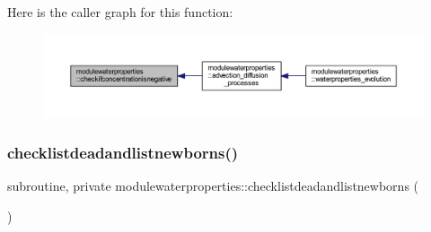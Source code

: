 Here is the caller graph for this function\+:\nopagebreak
\begin{figure}[H]
\begin{center}
\leavevmode
\includegraphics[width=350pt]{namespacemodulewaterproperties_a1edbcfe150c3db4a47036d7e4bfcdda3_icgraph}
\end{center}
\end{figure}
\mbox{\label{namespacemodulewaterproperties_ab88c2923a48aacf7da60a45cfeb98dfc}} 
\subsubsection{\texorpdfstring{checklistdeadandlistnewborns()}{checklistdeadandlistnewborns()}}
{\footnotesize\ttfamily subroutine, private modulewaterproperties\+::checklistdeadandlistnewborns (\begin{DoxyParamCaption}{ }\end{DoxyParamCaption})\hspace{0.3cm}{\ttfamily [private]}}

